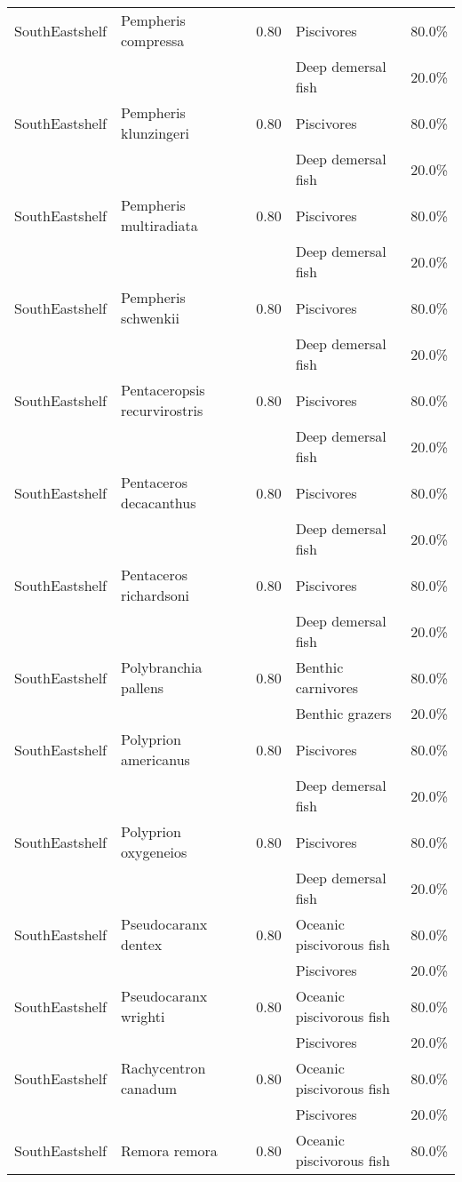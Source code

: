 \begin{longtable}{llcll}
\hline
SouthEastshelf & Pempheris compressa & 0.80 & Piscivores & 80.0\% \\
& & & Deep demersal fish & 20.0\% \\
\hline
SouthEastshelf & Pempheris klunzingeri & 0.80 & Piscivores & 80.0\% \\
& & & Deep demersal fish & 20.0\% \\
\hline
SouthEastshelf & Pempheris multiradiata & 0.80 & Piscivores & 80.0\% \\
& & & Deep demersal fish & 20.0\% \\
\hline
SouthEastshelf & Pempheris schwenkii & 0.80 & Piscivores & 80.0\% \\
& & & Deep demersal fish & 20.0\% \\
\hline
SouthEastshelf & Pentaceropsis recurvirostris & 0.80 & Piscivores & 80.0\% \\
& & & Deep demersal fish & 20.0\% \\
\hline
SouthEastshelf & Pentaceros decacanthus & 0.80 & Piscivores & 80.0\% \\
& & & Deep demersal fish & 20.0\% \\
\hline
SouthEastshelf & Pentaceros richardsoni & 0.80 & Piscivores & 80.0\% \\
& & & Deep demersal fish & 20.0\% \\
\hline
SouthEastshelf & Polybranchia pallens & 0.80 & Benthic carnivores & 80.0\% \\
& & & Benthic grazers & 20.0\% \\
\hline
SouthEastshelf & Polyprion americanus & 0.80 & Piscivores & 80.0\% \\
& & & Deep demersal fish & 20.0\% \\
\hline
SouthEastshelf & Polyprion oxygeneios & 0.80 & Piscivores & 80.0\% \\
& & & Deep demersal fish & 20.0\% \\
\hline
SouthEastshelf & Pseudocaranx dentex & 0.80 & Oceanic piscivorous fish & 80.0\% \\
& & & Piscivores & 20.0\% \\
\hline
SouthEastshelf & Pseudocaranx wrighti & 0.80 & Oceanic piscivorous fish & 80.0\% \\
& & & Piscivores & 20.0\% \\
\hline
SouthEastshelf & Rachycentron canadum & 0.80 & Oceanic piscivorous fish & 80.0\% \\
& & & Piscivores & 20.0\% \\
\hline
SouthEastshelf & Remora remora & 0.80 & Oceanic piscivorous fish & 80.0\% \\

\end{longtable}
